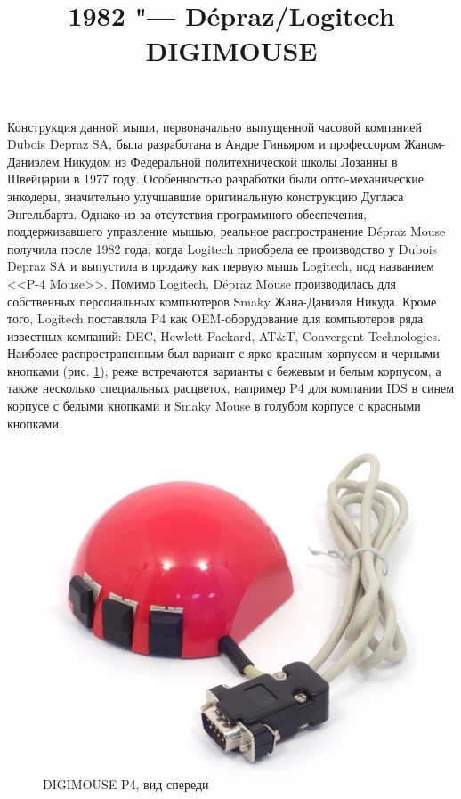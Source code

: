 \documentclass[11pt, a4paper]{article}
\begin{document}
\title{1982 "--- Dépraz/Logitech DIGIMOUSE}
\date{}
\maketitle

Конструкция данной мыши, первоначально выпущенной часовой компанией Dubois Depraz SA, была разработана в Андре Гиньяром и профессором Жаном-Даниэлем Никудом из Федеральной политехнической школы Лозанны в Швейцарии в 1977 году. Особенностью разработки были опто-механические энкодеры, значительно улучшавшие оригинальную конструкцию Дугласа Энгельбарта. Однако из-за отсутствия программного обеспечения, поддерживавшего управление мышью, реальное распространение Dépraz Mouse получила после 1982 года, когда Logitech приобрела ее производство у Dubois Depraz SA и выпустила в продажу как первую мышь Logitech, под названием <<P-4 Mouse>>.
Помимо Logitech, Dépraz Mouse производилась для собственных персональных компьютеров Smaky Жана-Даниэля Никуда. Кроме того, Logitech поставляла P4 как OEM-оборудование для компьютеров ряда известных компаний: DEC, Hewlett-Packard, AT\&T, Convergent Technologies. Наиболее распространенным был вариант с ярко-красным корпусом и черными кнопками (рис. \ref{fig:DIGIMOUSEP4Pic}); реже встречаются варианты с бежевым и белым корпусом, а также несколько специальных расцветок, например P4 для компании IDS в синем корпусе с белыми кнопками и Smaky Mouse в голубом корпусе с красными кнопками. 

\begin{figure}[h]
   \centering
    \includegraphics[scale=0.5]{1982_depraz_digimouse/pic_60.jpg}
    \caption{DIGIMOUSE P4, вид спереди}
    \label{fig:DIGIMOUSEP4Pic}
\end{figure}
\end{document}

